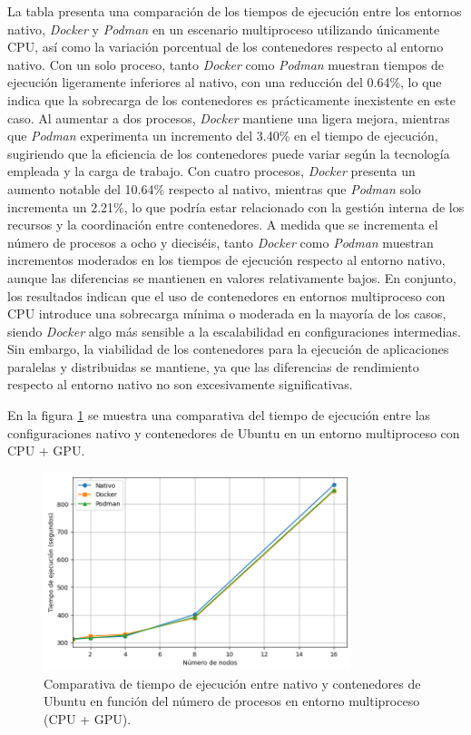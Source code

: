 La tabla presenta una comparación de los tiempos de ejecución entre los entornos nativo, \textit{Docker} y \textit{Podman} en un escenario multiproceso utilizando únicamente CPU, así como la variación porcentual de los contenedores respecto al entorno nativo. Con un solo proceso, tanto \textit{Docker} como \textit{Podman} muestran tiempos de ejecución ligeramente inferiores al nativo, con una reducción del 0.64\%, lo que indica que la sobrecarga de los contenedores es prácticamente inexistente en este caso. Al aumentar a dos procesos, \textit{Docker} mantiene una ligera mejora, mientras que \textit{Podman} experimenta un incremento del 3.40\% en el tiempo de ejecución, sugiriendo que la eficiencia de los contenedores puede variar según la tecnología empleada y la carga de trabajo. Con cuatro procesos, \textit{Docker} presenta un aumento notable del 10.64\% respecto al nativo, mientras que \textit{Podman} solo incrementa un 2.21\%, lo que podría estar relacionado con la gestión interna de los recursos y la coordinación entre contenedores. A medida que se incrementa el número de procesos a ocho y dieciséis, tanto \textit{Docker} como \textit{Podman} muestran incrementos moderados en los tiempos de ejecución respecto al entorno nativo, aunque las diferencias se mantienen en valores relativamente bajos. En conjunto, los resultados indican que el uso de contenedores en entornos multiproceso con CPU introduce una sobrecarga mínima o moderada en la mayoría de los casos, siendo \textit{Docker} algo más sensible a la escalabilidad en configuraciones intermedias. Sin embargo, la viabilidad de los contenedores para la ejecución de aplicaciones paralelas y distribuidas se mantiene, ya que las diferencias de rendimiento respecto al entorno nativo no son excesivamente significativas.

En la figura \ref{fig:multi-node_ubuntu_container_vs_native_gpu_time} se muestra una comparativa del tiempo de ejecución entre las configuraciones nativo y contenedores de Ubuntu en un entorno multiproceso con CPU + GPU.

\begin{figure}[ht]
    \centering
    \includegraphics[width=0.8\textwidth]{imagenes/cap5/multi-node_ubuntu_container_vs_native_gpu_time.png}
    \caption{Comparativa de tiempo de ejecución entre nativo y contenedores de Ubuntu en función del número de procesos en entorno multiproceso (CPU + GPU).}
    \label{fig:multi-node_ubuntu_container_vs_native_gpu_time}
\end{figure}

